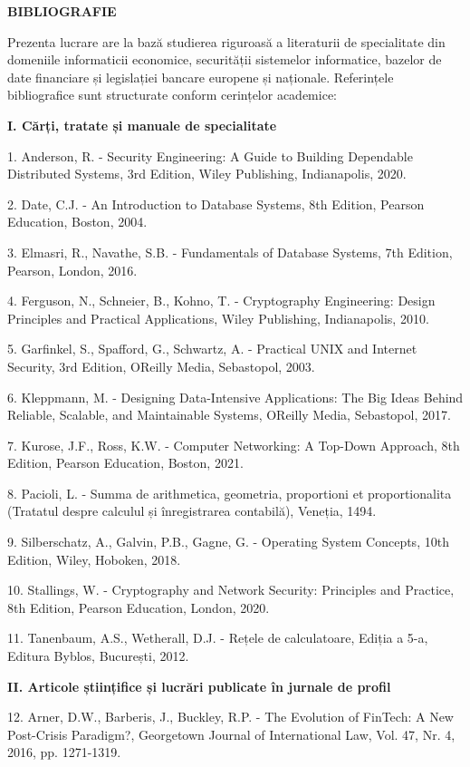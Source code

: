\documentclass[
]{article}
\begin{document}
\textbf{BIBLIOGRAFIE}

Prezenta lucrare are la bază studierea riguroasă a literaturii de
specialitate din domeniile informaticii economice, securității
sistemelor informatice, bazelor de date financiare și legislației
bancare europene și naționale. Referințele bibliografice sunt
structurate conform cerințelor academice:

\textbf{I. Cărți, tratate și manuale de specialitate}

1. Anderson, R. - Security Engineering: A Guide to Building Dependable
Distributed Systems, 3rd Edition, Wiley Publishing, Indianapolis, 2020.

2. Date, C.J. - An Introduction to Database Systems, 8th Edition,
Pearson Education, Boston, 2004.

3. Elmasri, R., Navathe, S.B. - Fundamentals of Database Systems, 7th
Edition, Pearson, London, 2016.

4. Ferguson, N., Schneier, B., Kohno, T. - Cryptography Engineering:
Design Principles and Practical Applications, Wiley Publishing,
Indianapolis, 2010.

5. Garfinkel, S., Spafford, G., Schwartz, A. - Practical UNIX and
Internet Security, 3rd Edition, O\textquotesingle Reilly Media,
Sebastopol, 2003.

6. Kleppmann, M. - Designing Data-Intensive Applications: The Big Ideas
Behind Reliable, Scalable, and Maintainable Systems,
O\textquotesingle Reilly Media, Sebastopol, 2017.

7. Kurose, J.F., Ross, K.W. - Computer Networking: A Top-Down Approach,
8th Edition, Pearson Education, Boston, 2021.

8. Pacioli, L. - Summa de arithmetica, geometria, proportioni et
proportionalita (Tratatul despre calculul și înregistrarea contabilă),
Veneția, 1494.

9. Silberschatz, A., Galvin, P.B., Gagne, G. - Operating System
Concepts, 10th Edition, Wiley, Hoboken, 2018.

10. Stallings, W. - Cryptography and Network Security: Principles and
Practice, 8th Edition, Pearson Education, London, 2020.

11. Tanenbaum, A.S., Wetherall, D.J. - Rețele de calculatoare, Ediția a
5-a, Editura Byblos, București, 2012.

\textbf{II. Articole științifice și lucrări publicate în jurnale de
profil}

12. Arner, D.W., Barberis, J., Buckley, R.P. - The Evolution of FinTech:
A New Post-Crisis Paradigm?, Georgetown Journal of International Law,
Vol. 47, Nr. 4, 2016, pp. 1271-1319.
\end{document}
